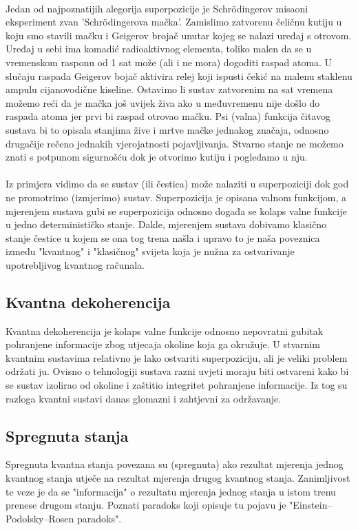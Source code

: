 \documentclass[times, utf8, zavrsni, numeric]{fer}
\begin{document}
\paragraph{}
Jedan od najpoznatijih alegorija superpozicije je Schr\"odingerov misaoni eksperiment zvan 'Schr\"odingerova mačka'. Zamislimo zatvorenu čeličnu kutiju u koju smo stavili mačku i Geigerov brojač unutar kojeg se nalazi uređaj s otrovom. Uređaj u sebi ima komadić radioaktivnog elementa, toliko malen da se u vremenskom rasponu od 1 sat može (ali i ne mora) dogoditi raspad atoma. U slučaju raspada Geigerov bojač aktivira relej koji ispusti čekić na malenu staklenu ampulu cijanovodične kiseline.
Ostavimo li sustav zatvorenim na sat vremena možemo reći da je mačka još uvijek živa ako u međuvremenu nije došlo do raspada atoma jer prvi bi raspad otrovao mačku. Psi (valna) funkcija čitavog sustava bi to opisala stanjima žive i mrtve mačke jednakog značaja, odnosno drugačije rečeno jednakih vjerojatnosti pojavljivanja.
Stvarno stanje ne možemo znati s potpunom sigurnošću dok je otvorimo kutiju i pogledamo u nju.

\paragraph{}
Iz primjera vidimo da se sustav (ili čestica) može nalaziti u superpoziciji dok god ne promotrimo (izmjerimo) sustav. Superpozicija je opisana valnom funkcijom, a mjerenjem sustava gubi se superpozicija odnosno događa se kolaps valne funkcije u jedno determinističko stanje. Dakle, mjerenjem sustava dobivamo klasično stanje čestice u kojem se ona tog trena našla i upravo to je naša poveznica između "kvantnog" i "klasičnog" svijeta koja je nužna za ostvarivanje upotrebljivog kvantnog računala.

\subsection{Kvantna dekoherencija}
Kvantna dekoherencija je kolaps valne funkcije odnosno nepovratni gubitak pohranjene informacije zbog utjecaja okoline koja ga okružuje.
U stvarnim kvantnim sustavima relativno je lako ostvariti superpoziciju, ali je veliki problem održati ju. Ovisno o tehnologiji sustava razni uvjeti moraju biti ostvareni kako bi se sustav izolirao od okoline i zaštitio integritet pohranjene informacije. Iz tog su razloga kvantni sustavi danas glomazni i zahtjevni za održavanje.

\subsection{Spregnuta stanja }
Spregnuta kvantna stanja povezana su (spregnuta) ako rezultat mjerenja jednog kvantnog stanja utječe na rezultat mjerenja drugog kvantnog stanja. Zanimljivost te veze je da se "informacija" o rezultatu mjerenja jednog stanja u istom trenu prenese drugom stanju. Poznati paradoks koji opisuje tu pojavu je "Einstein–Podolsky–Rosen paradoks".
\end{document}
